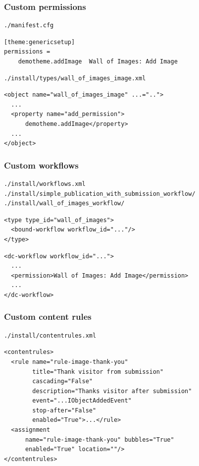 \documentclass[aspectratio=43]{beamer}
\begin{document}
\begin{frame}
\frametitle{Custom permissions}
\begin{verbatim}
./manifest.cfg
\end{verbatim}
\begin{verbatim}
[theme:genericsetup]
permissions =
    demotheme.addImage  Wall of Images: Add Image
\end{verbatim}
\begin{verbatim}
./install/types/wall_of_images_image.xml
\end{verbatim}
\begin{verbatim}
<object name="wall_of_images_image" ...="..">
  ...
  <property name="add_permission">
      demotheme.addImage</property>
  ...
</object>
\end{verbatim}
\end{frame}

\begin{frame}
\frametitle{Custom workflows}
\begin{verbatim}
./install/workflows.xml
./install/simple_publication_with_submission_workflow/
./install/wall_of_images_workflow/
\end{verbatim}
\begin{verbatim}
<type type_id="wall_of_images">
  <bound-workflow workflow_id="..."/>
</type>
\end{verbatim}
\begin{verbatim}
<dc-workflow workflow_id="...">
  ...
  <permission>Wall of Images: Add Image</permission>
  ...
</dc-workflow>
\end{verbatim}
\end{frame}

\begin{frame}
\frametitle{Custom content rules}
\begin{verbatim}
./install/contentrules.xml
\end{verbatim}
\begin{verbatim}
<contentrules>
  <rule name="rule-image-thank-you"
        title="Thank visitor from submission"
        cascading="False"
        description="Thanks visitor after submission"
        event="...IObjectAddedEvent"
        stop-after="False"
        enabled="True">...</rule>
  <assignment
      name="rule-image-thank-you" bubbles="True"
      enabled="True" location=""/>
</contentrules>
\end{verbatim}
\end{frame}
\end{document}
